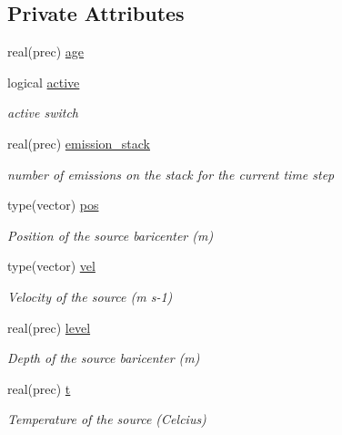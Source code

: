 \subsection*{Private Attributes}
\begin{DoxyCompactItemize}
\item 
real(prec) \mbox{\hyperlink{structsources__mod_1_1source__state_a60a0c06c969401978a8cd13b4682fe1c}{age}}
\item 
logical \mbox{\hyperlink{structsources__mod_1_1source__state_ab31d51c870b76a1e4ca9b03f5847a7c2}{active}}
\begin{DoxyCompactList}\small\item\em active switch \end{DoxyCompactList}\item 
real(prec) \mbox{\hyperlink{structsources__mod_1_1source__state_a8c705a419fbe999e624ac42ae586700a}{emission\+\_\+stack}}
\begin{DoxyCompactList}\small\item\em number of emissions on the stack for the current time step \end{DoxyCompactList}\item 
type(vector) \mbox{\hyperlink{structsources__mod_1_1source__state_a8dacf7040158bb5214f66476bf1a1c3d}{pos}}
\begin{DoxyCompactList}\small\item\em Position of the source baricenter (m) \end{DoxyCompactList}\item 
type(vector) \mbox{\hyperlink{structsources__mod_1_1source__state_a52c6f025eb262a7a07b2a8b4ec7065ac}{vel}}
\begin{DoxyCompactList}\small\item\em Velocity of the source (m s-\/1) \end{DoxyCompactList}\item 
real(prec) \mbox{\hyperlink{structsources__mod_1_1source__state_a0dde0c4e9fd145055b0861168120e4c9}{level}}
\begin{DoxyCompactList}\small\item\em Depth of the source baricenter (m) \end{DoxyCompactList}\item 
real(prec) \mbox{\hyperlink{structsources__mod_1_1source__state_a7d51970a13f9664bbaf9d09afea0b363}{t}}
\begin{DoxyCompactList}\small\item\em Temperature of the source (Celcius) \end{DoxyCompactList}\end{DoxyCompactItemize}


